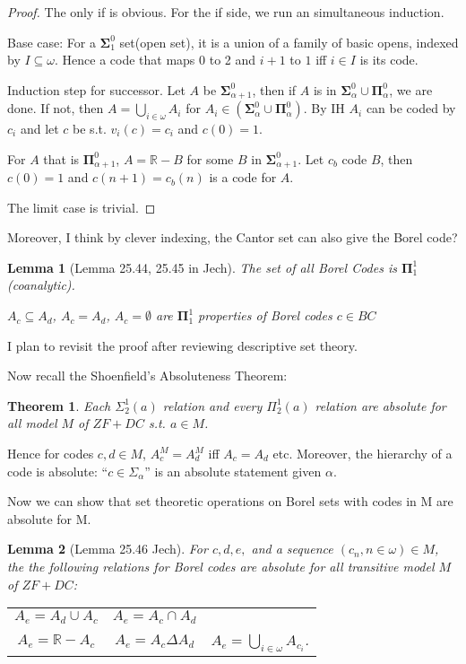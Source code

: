 \documentclass{article}
\newtheorem{lemma}{Lemma}
\newtheorem{theorem}{Theorem}
\begin{document}
\begin{proof}
    The only if is obvious. For the if side, we run an simultaneous induction.

    Base case: For a $\boldsymbol{\Sigma}_1^0$ set(open set), it is a union of a family of basic opens, indexed by $I\subseteq \omega$. Hence a code that maps $0$ to 2 and $i+1$ to $1$ iff $i\in I$ is its code.

    Induction step for successor. Let $A$ be $\boldsymbol{\Sigma}_{\alpha+1}^0$, then if $A$ is in $\boldsymbol{\Sigma}_{\alpha}^0\cup \boldsymbol{\Pi}_{\alpha}^0$, we are done. If not, then $A = \bigcup_{i\in \omega}A_{i}$ for $A_i\in (\boldsymbol{\Sigma}_\alpha^0\cup \boldsymbol{\Pi}_\alpha^0)$. By IH $A_i$ can be coded by $c_i$ and let $c$ be s.t. $v_i(c) = c_i$ and $c(0) = 1$.

    For $A$ that is $\boldsymbol{\Pi}_{\alpha+1}^0$, $A = \mathbb{R} - B$ for some $B$ in $\boldsymbol{\Sigma}_{\alpha+1}^0$. Let $c_b$ code $B$, then $c(0) = 1$ and $c(n+1) = c_b(n)$ is a code for $A$.

    The limit case is trivial.
\end{proof}

Moreover, I think by clever indexing, the Cantor set can also give the Borel code?


\begin{lemma}[Lemma 25.44, 25.45 in Jech]
    The set of all Borel Codes is $\boldsymbol{\Pi}^1_1$ (coanalytic).

    $A_c\subseteq A_d$, $A_c = A_d$, $A_c = \emptyset$ are $\boldsymbol{\Pi}^1_1$ properties of Borel codes $c\in BC$
\end{lemma}

I plan to revisit the proof after reviewing descriptive set theory.

Now recall the Shoenfield’s Absoluteness Theorem:

\begin{theorem}
    Each $\Sigma^1_2(a)$ relation and every $\Pi^1_2(a)$ relation are absolute for all model $M$ of $ZF+DC$ s.t. $a\in M$.
\end{theorem}

Hence for codes $c,d\in M$, $A_c^M = A_d^M$ iff $A_c = A_d$ etc. Moreover, the hierarchy of a code is absolute: ``$c\in \Sigma_\alpha$'' is an absolute statement given $\alpha$.

Now we can show that set theoretic operations on Borel sets with codes
in M are absolute for M.

\begin{lemma}[Lemma 25.46 Jech]\label{lem:absolute}
    For $c,d,e,$ and a sequence $(c_n,n\in \omega)\in M$, the the following relations for Borel codes are absolute for all transitive model $M$ of $ZF+DC$:

    \begin{tabular}{ccc}
        $A_e = A_d\cup A_c$ & $A_e = A_c\cap A_d$ & \\
        $A_e = \mathbb{R} - A_c$ & $A_e = A_c\Delta A_d$ & $A_e= \bigcup_{i\in \omega}A_{c_i}$.
    \end{tabular}
\end{lemma}
\end{document}
